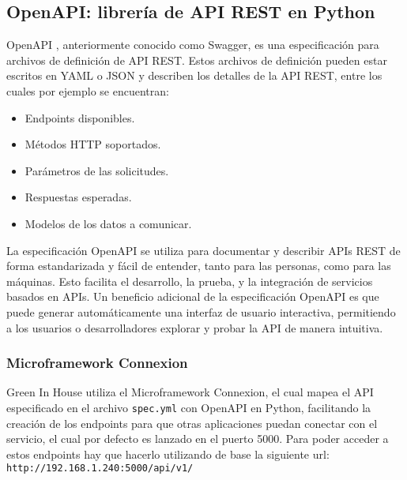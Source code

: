     \subsection{OpenAPI: librería de API REST en Python}
    OpenAPI \cite{wiki:openapi}, anteriormente conocido como Swagger, es una especificación para archivos de definición de API REST. Estos archivos de definición pueden estar escritos en YAML o JSON y describen los detalles de la API REST, entre los cuales por ejemplo se encuentran:
    \begin{itemize}
        \item Endpoints disponibles.
        \item Métodos HTTP soportados.
        \item Parámetros de las solicitudes.
        \item Respuestas esperadas.
        \item Modelos de los datos a comunicar.
    \end{itemize}
    La especificación OpenAPI se utiliza para documentar y describir APIs REST de forma estandarizada y fácil de entender, tanto para las personas, como para las máquinas. Esto facilita el desarrollo, la prueba, y la integración de servicios basados en APIs. Un beneficio adicional de la especificación OpenAPI es que puede generar automáticamente una interfaz de usuario interactiva, permitiendo a los usuarios o desarrolladores explorar y probar la API de manera intuitiva.
        \subsubsection{Microframework Connexion}
        Green In House utiliza el Microframework Connexion, el cual mapea el
        API especificado en el archivo \texttt{spec.yml} con OpenAPI en Python, facilitando la creación de los endpoints para que otras aplicaciones puedan conectar con el servicio, el cual por defecto es lanzado en el puerto 5000. Para poder acceder a estos endpoints hay que hacerlo utilizando de base la siguiente url: \texttt{http://192.168.1.240:5000/api/v1/}
